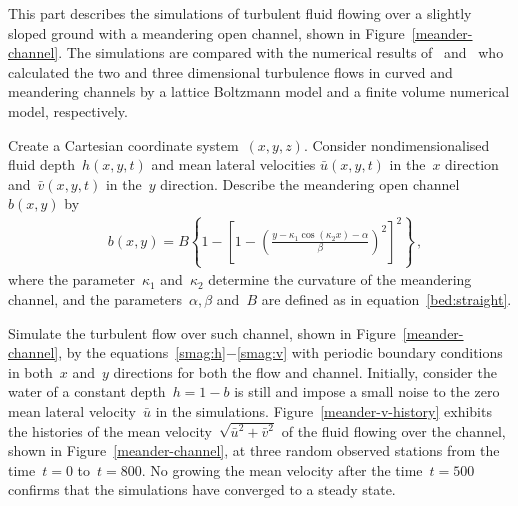 \documentclass[12pt,a5paper]{article}
\newcommand{\uu}{{\bar u}}
\newcommand{\vv}{{\bar v}}
\begin{document}
This part describes the simulations of turbulent fluid flowing over a slightly sloped ground with a meandering open channel, shown in Figure~\ref{meander-channel}. The simulations are compared with the numerical results of~\cite{Liu2009} and~\cite{Demuren1993} who calculated the two and three dimensional turbulence flows in curved and meandering channels by a lattice Boltzmann model and a finite volume numerical model, respectively.

Create a Cartesian coordinate system~$(x,y,z)$. Consider nondimensionalised fluid depth~$h(x,y,t)$ and mean lateral velocities $\uu(x,y,t)$ in the~$x$ direction and~$\vv(x,y,t)$ in the~$y$ direction. Describe the meandering open channel~$b(x,y)$ by
\begin{align}&
b(x,y)=B\left\{1-\left[1-\left(\frac{y-\kappa_1\cos(\kappa_2x)-\alpha}{\beta}\right)^2\right]^2\right\}\,,\label{bed:meander}
\end{align}
where the parameter~$\kappa_1$ and~$\kappa_2$ determine the curvature of the meandering channel, and the parameters~$\alpha, \beta$ and~$B$ are defined as in equation~\eqref{bed:straight}.

Simulate the turbulent flow over such channel, shown in Figure~\ref{meander-channel}, by the equations~\eqref{smag:h}$-$\eqref{smag:v} with periodic boundary conditions in both~$x$ and~$y$ directions for both the flow and channel. Initially, consider the water of a constant depth~$h=1-b$ is still and impose a small noise to the zero mean lateral velocity~$\uu$ in the simulations. Figure~\ref{meander-v-history} exhibits the histories of the mean velocity~$\sqrt{\uu^2+\vv^2}$ of the fluid flowing over the channel, shown in Figure~\ref{meander-channel}, at three random observed stations from the time~$t=0$ to~$t=800$. No growing the mean velocity after the time~$t=500$ confirms that the simulations have converged to a steady state.
\end{document}
